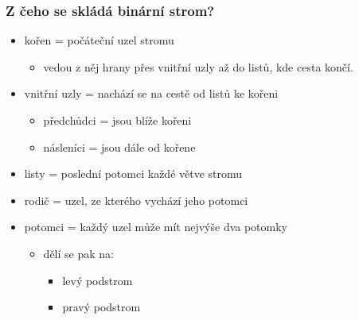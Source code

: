 \documentclass{beamer}
\begin{document}
\begin{frame}
\frametitle{Z čeho se skládá binární strom?}

\begin{itemize}
\item kořen = počáteční uzel stromu
\begin{itemize}
    \item vedou z něj hrany přes vnitřní uzly  až do listů, kde cesta končí.
\end{itemize}

\item vnitřní uzly = nachází se na cestě od listů ke kořeni
\begin{itemize}
\item předchůdci =  jsou blíže kořeni
\item násleníci = jsou dále od kořene
\end{itemize}
\item listy = poslední potomci každé větve stromu
\item rodič = uzel, ze kterého vychází jeho potomci

\item potomci = každý uzel může mít nejvýše dva potomky
\begin{itemize}
\item dělí se pak na:
\begin{itemize}
    \item levý podstrom
    \item pravý podstrom
\end{itemize}
\end{itemize}
\end{itemize}
\end{frame}
\end{document}
